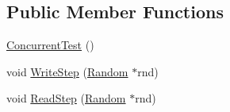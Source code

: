 \subsection*{Public Member Functions}
\begin{DoxyCompactItemize}
\item 
\hyperlink{classleveldb_1_1_concurrent_test_acd93a8fa57d9a10871ec24c419f5ea88}{Concurrent\+Test} ()
\item 
void \hyperlink{classleveldb_1_1_concurrent_test_a43dc8afb9124c364d6e97dc3d421131f}{Write\+Step} (\hyperlink{classleveldb_1_1_random}{Random} $\ast$rnd)
\item 
void \hyperlink{classleveldb_1_1_concurrent_test_a9dcaf11ec747ad37150526f891627c50}{Read\+Step} (\hyperlink{classleveldb_1_1_random}{Random} $\ast$rnd)
\end{DoxyCompactItemize}

